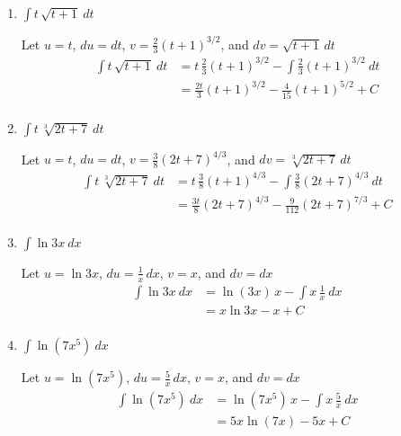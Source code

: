 \documentclass[12pt]{article}
\begin{document}
\begin{enumerate}
\item $\displaystyle\int t\,\sqrt{t+1} \ dt$

Let $u=t$, $du=dt$, $v=\displaystyle\frac{2}{3}(t+1)^{3/2}$, and $dv =\sqrt{t+1} \,dt$
\begin{equation*}
\begin{aligned}
\int t\,\sqrt{t+1} \ dt &= t\,\frac{2}{3}(t+1)^{3/2} - \int \frac{2}{3} (t+1)^{3/2} \ dt \\
&= \frac{2t}{3}(t+1)^{3/2} -  \frac{4}{15} (t+1)^{5/2} + C \\
\end{aligned}
\end{equation*}

\item $\displaystyle\int t\,\sqrt[3]{2t+7} \ dt$

Let $u=t$, $du=dt$, $v=\displaystyle\frac{3}{8}(2t+7)^{4/3}$, and $dv =\sqrt[3]{2t+7}\,dt$
\begin{equation*}
\begin{aligned}
\int t\,\sqrt[3]{2t+7} \ dt &= t\,\frac{3}{8}(t+1)^{4/3} - \int \frac{3}{8}(2t+7)^{4/3} \ dt \\
&= \frac{3t}{8}(2t+7)^{4/3} -  \frac{9}{112} (2t+7)^{7/3} + C \\
\end{aligned}
\end{equation*}

\item $\displaystyle\int \ln 3x \ dx$

Let $u=\ln 3x$, $du=\displaystyle\frac{1}{x}\,dx$, $v=x$, and $dv =dx$
\begin{equation*}
\begin{aligned}
\int \ln 3x \ dx &= \ln (3x)\,x - \int x\,\frac{1}{x}\ dx \\
&= x \ln 3x - x + C\\
\end{aligned}
\end{equation*}

\item $\displaystyle\int \ln (7x^5) \ dx$

Let $u=\ln (7x^5)$, $du=\displaystyle\frac{5}{x}\,dx$, $v=x$, and $dv =dx$
\begin{equation*}
\begin{aligned}
\int \ln (7x^5) \ dx &= \ln (7x^5)\,x - \int x\,\frac{5}{x}\ dx \\
&= 5x \ln (7x) - 5x + C\\
\end{aligned}
\end{equation*}


\end{enumerate}
\end{document}
